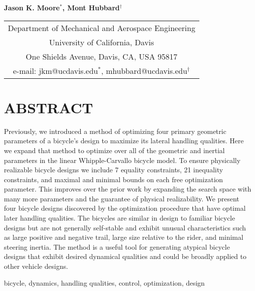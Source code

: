 \documentclass{bmd2019p}
\begin{document}
\begin{center}
\end{center}

\begin{center}
  \normalsize{\bf{Jason K. Moore$^{*}$, Mont Hubbard$^\dag$}}
\end{center}

\begin{center}
  \begin{tabular}{c}
    Department of Mechanical and Aerospace Engineering\\
    University of California, Davis\\
    One Shields Avenue, Davis, CA, USA 95817\\
    e-mail: jkm@ucdavis.edu$^{*}$, mhubbard@ucdavis.edu$^\dag$
  \end{tabular}
\end{center}

\section*{ABSTRACT}
%
Previously, we introduced a method of optimizing four primary geometric
parameters of a bicycle's design to maximize its lateral handling qualities.
Here we expand that method to optimize over all of the geometric and inertial
parameters in the linear Whipple-Carvallo bicycle model. To ensure physically
realizable bicycle designs we include 7 equality constraints, 21 inequality
constraints, and maximal and minimal bounds on each free optimization
parameter. This improves over the prior work by expanding the search space with
many more parameters and the guarantee of physical realizability. We present
four bicycle designs discovered by the optimization procedure that have optimal
later handling qualities. The bicycles are similar in design to familiar
bicycle designs but are not generally self-stable and exhibit unusual
characteristics such as large positive and negative trail, large size relative
to the rider, and minimal steering inertia. The method is a useful tool for
generating atypical bicycle designs that exhibit desired dynamical qualities
and could be broadly applied to other vehicle designs.
%
\begin{keywords}
  bicycle,
  dynamics,
  handling qualities,
  control,
  optimization,
  design
\end{keywords}
\end{document}
